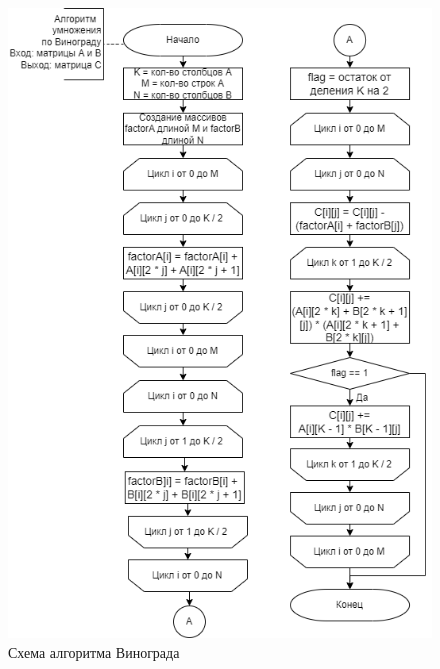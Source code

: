 \documentclass[a4paper,14pt, unknownkeysallowed]{extreport}
\begin{document}
\begin{figure}[h!]
	\centering
	\includegraphics[scale=0.9]{img/wino.png}
	\caption{Схема алгоритма Винограда}
	\label{fig:wino}
\end{figure}

\clearpage
\end{document}
